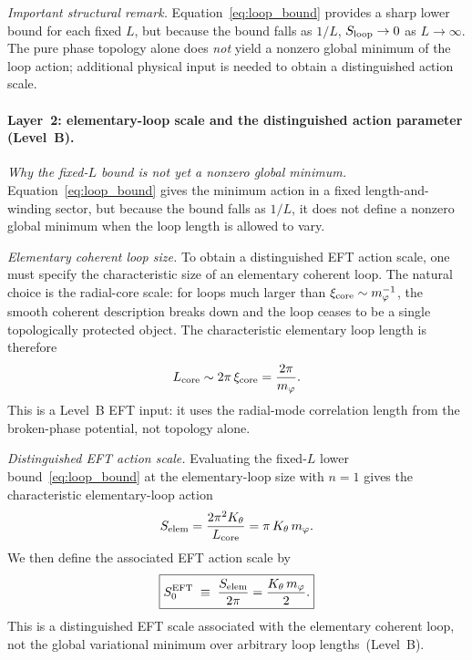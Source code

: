 \documentclass[11pt,a4paper]{article}
\numberwithin{equation}{section}
\begin{document}
\emph{Important structural remark.}
Equation~\eqref{eq:loop_bound} provides a sharp lower bound for
each fixed $L$, but because the bound falls as $1/L$,
$S_{\rm loop}\to 0$ as $L\to\infty$.
The pure phase topology alone does \emph{not} yield a nonzero
global minimum of the loop action; additional physical input is
needed to obtain a distinguished action scale.


\paragraph{Layer~2: elementary-loop scale and the distinguished
action parameter (Level~B).}

\emph{Why the fixed-$L$ bound is not yet a nonzero global minimum.}
Equation~\eqref{eq:loop_bound} gives the minimum action in a
fixed length-and-winding sector, but because the bound falls as
$1/L$, it does not define a nonzero global minimum when the loop
length is allowed to vary.

\emph{Elementary coherent loop size.}
To obtain a distinguished EFT action scale, one must specify the
characteristic size of an elementary coherent loop.
The natural choice is the radial-core scale: for loops much larger
than $\xi_{\rm core}\sim m_\varphi^{-1}$, the smooth coherent
description breaks down and the loop ceases to be a single
topologically protected object.
The characteristic elementary loop length is therefore
\begin{equation}
  L_{\rm core}\sim 2\pi\,\xi_{\rm core}
  = \frac{2\pi}{m_\varphi}.
  \label{eq:Lcore}
\end{equation}
This is a Level~B EFT input: it uses the radial-mode correlation
length from the broken-phase potential, not topology alone.

\emph{Distinguished EFT action scale.}
Evaluating the fixed-$L$ lower bound~\eqref{eq:loop_bound} at the
elementary-loop size with $n=1$ gives the characteristic
elementary-loop action
\begin{equation}
  S_{\rm elem}
  = \frac{2\pi^2 K_\theta}{L_{\rm core}}
  = \pi\,K_\theta\,m_\varphi.
  \label{eq:S_elem}
\end{equation}
We then define the associated EFT action scale by
\begin{equation}
  \boxed{S_0^{\rm EFT}
  \;\equiv\;
  \frac{S_{\rm elem}}{2\pi}
  = \frac{K_\theta\,m_\varphi}{2}.}
  \label{eq:S0_EFT}
\end{equation}
This is a distinguished EFT scale associated with the elementary
coherent loop, not the global variational minimum over arbitrary
loop lengths~(Level~B).
\end{document}
